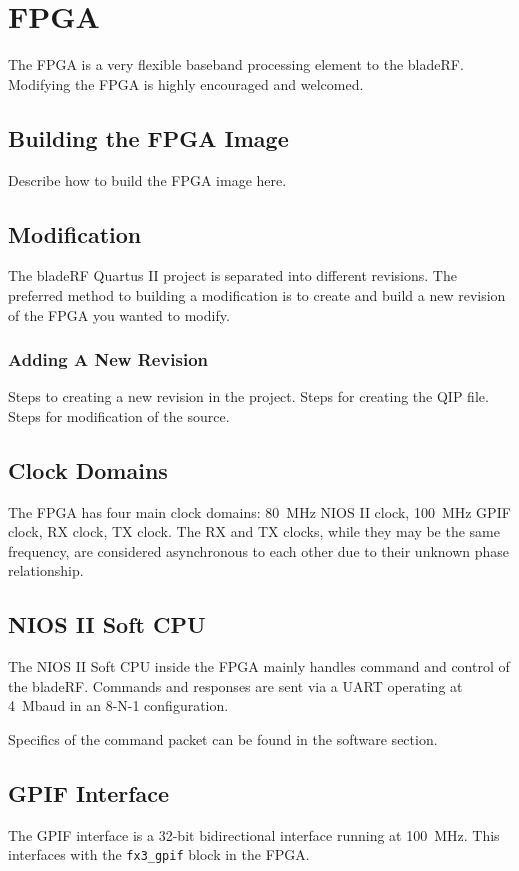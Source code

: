 \section{FPGA} \label{sec:arch}

The FPGA is a very flexible baseband processing element to the bladeRF.
Modifying the FPGA is highly encouraged and welcomed.

\subsection{Building the FPGA Image} \label{sec:fpga-building}
Describe how to build the FPGA image here.

\subsection{Modification} \label{sec:fpga-mods}
The bladeRF Quartus II project is separated into different revisions.  The
preferred method to building a modification is to create and build a new
revision of the FPGA you wanted to modify.

\subsubsection{Adding A New Revision} \label{sec:fgpa-newrev}
Steps to creating a new revision in the project.
Steps for creating the QIP file.
Steps for modification of the source.

\subsection{Clock Domains} \label{sec:fpga-clocks}
The FPGA has four main clock domains: 80~MHz NIOS II clock, 100~MHz GPIF clock,
RX clock, TX clock.  The RX and TX clocks, while they may be the same
frequency, are considered asynchronous to each other due to their unknown
phase relationship.

\subsection{NIOS II Soft CPU} \label{sec:fpga-nios}
The NIOS II Soft CPU inside the FPGA mainly handles command and control of the
bladeRF.  Commands and responses are sent via a UART operating at 4~Mbaud in
an 8-N-1 configuration.

Specifics of the command packet can be found in the software section.

\subsection{GPIF Interface} \label{sec:fpga-gpif}
The GPIF interface is a 32-bit bidirectional interface running at 100~MHz.
This interfaces with the \texttt{fx3\_gpif} block in the FPGA.

